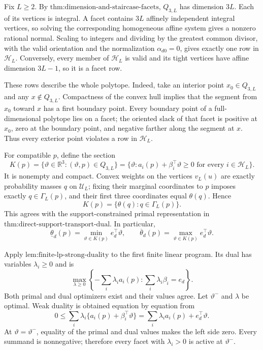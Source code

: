 Fix \(L\ge2\).  By \(\text{thm:dimension-and-staircase-facets}\), \(Q_{3,L}\) has dimension \(3L\).  Each of its vertices is integral.  A facet contains \(3L\) affinely independent integral vertices, so solving the corresponding homogeneous affine system gives a nonzero rational normal.  Scaling to integers and dividing by the greatest common divisor, with the valid orientation and the normalization \(\alpha_{d0}=0\), gives exactly one row in \(\mathcal H_L\).  Conversely, every member of \(\mathcal H_L\) is valid and its tight vertices have affine dimension \(3L-1\), so it is a facet row.

These rows describe the whole polytope.  Indeed, take an interior point \(x_0\in Q_{3,L}\) and any \(x\notin Q_{3,L}\).  Compactness of the convex hull implies that the segment from \(x_0\) toward \(x\) has a first boundary point.  Every boundary point of a full-dimensional polytope lies on a facet; the oriented slack of that facet is positive at \(x_0\), zero at the boundary point, and negative farther along the segment at \(x\).  Thus every exterior point violates a row in \(\mathcal H_L\).

For compatible \(p\), define the section
\[
 K(p)=\{\vartheta\in\mathbb R^3:(\vartheta,p)\in Q_{3,L}\}
 =\{\vartheta:a_i(p)+\beta_i^\top\vartheta\ge0\text{ for every }i\in\mathcal H_L\}.
\]
It is nonempty and compact.  Convex weights on the vertices \(v_L(u)\) are exactly probability masses \(q\) on \(\mathcal U_L\); fixing their marginal coordinates to \(p\) imposes exactly \(q\in\Gamma_L(p)\), and their first three coordinates equal \(\theta(q)\).  Hence
\[
 K(p)=\{\theta(q):q\in\Gamma_L(p)\}.
\]
This agrees with the support-constrained primal representation in \(\text{thm:direct-support-transport-dual}\).  In particular,
\[
 \underline\theta_d(p)=\min_{\vartheta\in K(p)}e_d^\top\vartheta,
 \qquad
 \overline\theta_d(p)=\max_{\vartheta\in K(p)}e_d^\top\vartheta.
\]

Apply \(\text{lem:finite-lp-strong-duality}\) to the first finite linear program.  Its dual has variables \(\lambda_i\ge0\) and is
\[
 \max_{\lambda\ge0}\left\{-\sum_i\lambda_i a_i(p):\sum_i\lambda_i\beta_i=e_d\right\}.
\]
Both primal and dual optimizers exist and their values agree.  Let \(\vartheta^-\) and \(\lambda\) be optimal.  Weak duality is obtained equation by equation from
\[
 0\le\sum_i\lambda_i\{a_i(p)+\beta_i^\top\vartheta\}
 =\sum_i\lambda_i a_i(p)+e_d^\top\vartheta.
\]
At \(\vartheta=\vartheta^-\), equality of the primal and dual values makes the left side zero.  Every summand is nonnegative; therefore every facet with \(\lambda_i>0\) is active at \(\vartheta^-\).

